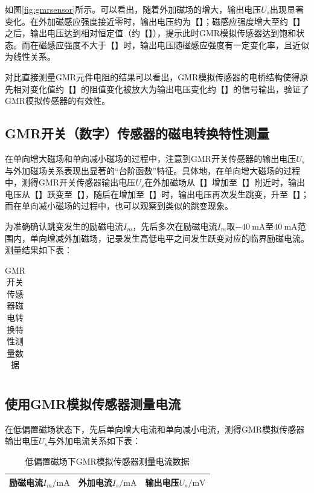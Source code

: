\documentclass{thuemp}
\begin{document}
如图\ref{fig:gmrsensor}所示。可以看出，随着外加磁场的增大，输出电压$U_s$出现显著变化。在外加磁感应强度接近零时，输出电压约为【】；磁感应强度增大至约【】之后，输出电压达到相对恒定值（约【】），提示此时GMR模拟传感器达到饱和状态。而在磁感应强度不大于【】时，输出电压随磁感应强度有一定变化率，且近似为线性关系。

对比直接测量GMR元件电阻的结果可以看出，GMR模拟传感器的电桥结构使得原先相对变化值约【】的阻值变化被放大为输出电压变化约【】的信号输出，验证了GMR模拟传感器的有效性。

\subsection{GMR开关（数字）传感器的磁电转换特性测量}

在单向增大磁场和单向减小磁场的过程中，注意到GMR开关传感器的输出电压$U_s$与外加磁场关系表现出显著的“台阶函数”特征。具体地，在单向增大磁场的过程中，测得GMR开关传感器输出电压$U_s$在外加磁场从【】增加至【】附近时，输出电压从【】跃变至【】，随后在增加至【】时，输出电压再次发生跳变，升至【】；而在单向减小磁场的过程中，也可以观察到类似的跳变现象。

为准确确认跳变发生的励磁电流$I_m$，先后多次在励磁电流$I_m$取$-40 ~ \mathrm{mA}$至$40 ~ \mathrm{mA}$范围内，单向增减外加磁场，记录发生高低电平之间发生跃变对应的临界励磁电流。测量结果如下表：

\begin{table}[H]
    \centering
    \captionnamefont{\wuhao\bf\heiti}
    \captiontitlefont{\wuhao\bf\heiti}
    \caption{GMR开关传感器磁电转换特性测量数据} \label{tab:gmr_switch}
    \liuhao
        \begin{tabular}{|c|c|c|c|c|}
        \toprule
        \midrule
        \bottomrule
        \end{tabular}
\end{table}

\subsection{使用GMR模拟传感器测量电流}

在低偏置磁场状态下，先后单向增大电流和单向减小电流，测得GMR模拟传感器输出电压$U_s$与外加电流关系如下表：

\begin{table}[H]
    \centering
    \captionnamefont{\wuhao\bf\heiti}
    \captiontitlefont{\wuhao\bf\heiti}
    \caption{低偏置磁场下GMR模拟传感器测量电流数据} \label{tab:gmr_current_low}
    \liuhao
    \begin{tabular}{|c|c|c|}
        \toprule
        励磁电流$I_m/\mathrm{mA}$ & 外加电流$I_s/\mathrm{mA}$ & 输出电压$U_s/\mathrm{mV}$ \\ \hline
        \midrule
        \bottomrule
    \end{tabular}
\end{table}
\end{document}
